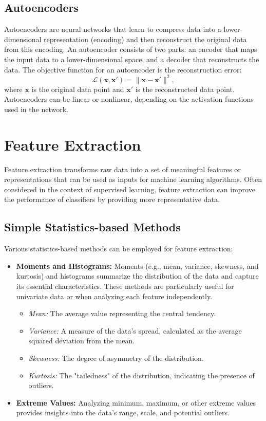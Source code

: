 \documentclass[12pt]{article}
\begin{document}
\subsection{Autoencoders}
Autoencoders are neural networks that learn to compress data into a lower-dimensional representation (encoding) and then reconstruct the original data from this encoding. An autoencoder consists of two parts: an encoder that maps the input data to a lower-dimensional space, and a decoder that reconstructs the data. The objective function for an autoencoder is the reconstruction error:
\begin{equation}
\mathcal{L}(\bm{x}, \bm{x}') = \|\bm{x} - \bm{x}'\|^2,
\end{equation}
where \(\bm{x}\) is the original data point and \(\bm{x}'\) is the reconstructed data point. Autoencoders can be linear or nonlinear, depending on the activation functions used in the network.

\section{Feature Extraction}

Feature extraction transforms raw data into a set of meaningful features or representations that can be used as inputs for machine learning algorithms. Often considered in the context of supervised learning, feature extraction can improve the performance of classifiers by providing more representative data.

\subsection{Simple Statistics-based Methods}
Various statistics-based methods can be employed for feature extraction:
\begin{itemize}
    \item \textbf{Moments and Histograms:}  
    Moments (e.g., mean, variance, skewness, and kurtosis) and histograms summarize the distribution of the data and capture its essential characteristics. These methods are particularly useful for univariate data or when analyzing each feature independently.
    \begin{itemize}
        \item \textit{Mean:} The average value representing the central tendency.
        \item \textit{Variance:} A measure of the data's spread, calculated as the average squared deviation from the mean.
        \item \textit{Skewness:} The degree of asymmetry of the distribution.
        \item \textit{Kurtosis:} The "tailedness" of the distribution, indicating the presence of outliers.
    \end{itemize}
    \item \textbf{Extreme Values:}  
    Analyzing minimum, maximum, or other extreme values provides insights into the data’s range, scale, and potential outliers.
\end{itemize}
\end{document}
